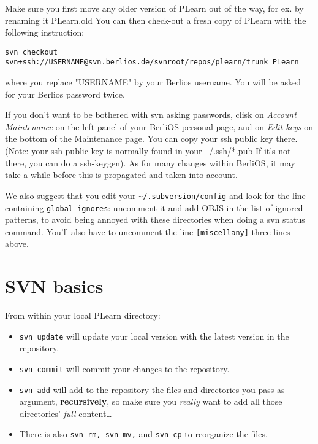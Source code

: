\documentclass[11pt]{book}
\begin{document}
Make sure you first move any older version of PLearn out of the way, for ex. by renaming it PLearn.old
You can then check-out a fresh copy of PLearn with the following instruction:
\begin{verbatim}
svn checkout svn+ssh://USERNAME@svn.berlios.de/svnroot/repos/plearn/trunk PLearn
\end{verbatim}
where you replace "USERNAME" by your Berlios username.
You will be asked for your Berlios password twice.

If you don't want to be bothered with svn asking passwords, clisk on {\em
  Account Maintenance} on the left panel of your BerliOS personal page, and
on {\em Edit keys} on the bottom of the Maintenance page.  You can copy
your ssh public key there. (Note: your ssh public key is normally found in
your ~/.ssh/*.pub If it's not there, you can do a ssh-keygen). As for many
changes within BerliOS, it may take a while before this is propagated and
taken into account.

We also suggest that you edit your \verb!~/.subversion/config! and look for
the line containing \verb!global-ignores!: uncomment it and add OBJS in the list
of ignored patterns, to avoid being annoyed with these directories when
doing a svn status command. You'll also have to uncomment the line
\verb![miscellany]! three lines above.



\section{SVN basics}

From within your local PLearn directory:
\begin{itemize}
\item {\tt svn update} will update your local version with the latest
  version in the repository.
\item {\tt svn commit} will commit your changes to the repository.
\item {\tt svn add} will add to the repository the files and directories
  you pass as argument, {\bf recursively}, so make sure you {\em really} want to
  add all those directories' {\em full} content\ldots
\item There is also {\tt svn rm, svn mv,} and {\tt svn cp} to reorganize the files.
\end{itemize}
\end{document}
